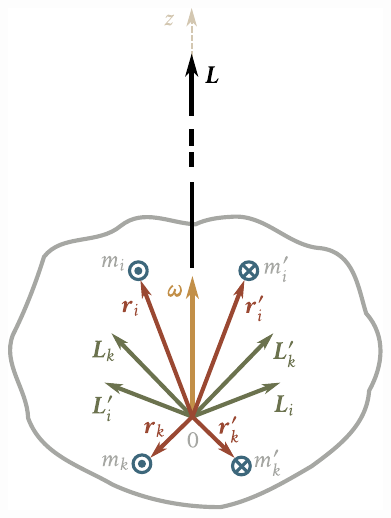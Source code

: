 \begin{figure}[!htb]
	\begin{center}
		\includegraphics[scale=0.95]{figures/ch_05/fig_5_5.pdf}
		\caption[]{}
		\label{fig:5_5}
	\end{center}
\end{figure}

